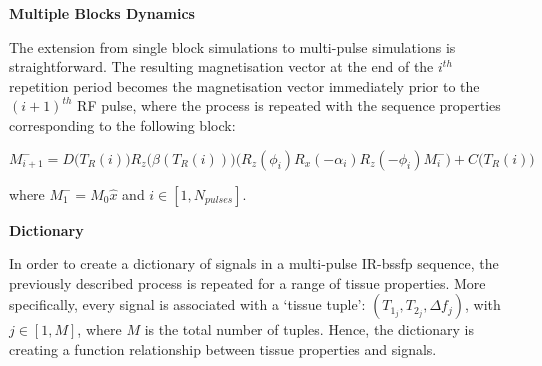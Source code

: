 \hfill

\large \textbf{Multiple Blocks Dynamics} \normalsize

The extension from single block simulations to multi-pulse simulations is straightforward.
The resulting magnetisation vector at the end of the $i^{th}$ repetition period becomes the magnetisation vector immediately prior to the $(i+1)^{th}$ RF pulse, where the process is repeated with the sequence properties corresponding to the following block:

\begin{equation}
    M^{-}_{i+1} = D\big(T_R(i)\big) R_z\big(\beta(T_R(i))\big) \big( R_{z}(\phi_i) R_{x}(-\alpha_i) R_{z}(-\phi_i) M^{-}_i \big) + C\big(T_R(i)\big)
\end{equation}

where $M^{-}_1 = M_0 \hat{x}$ and $i \in [1, N_{pulses}]$.

\hfill



\large \textbf{Dictionary} \normalsize

In order to create a dictionary of signals in a multi-pulse IR-\ac{bssfp} sequence, the previously described process is repeated for a range of tissue properties.
More specifically, every signal is associated with a `tissue tuple':
$(T_{1_j}, T_{2_j}, \Delta f_{j})$, with $j \in [1, M]$, where $M$ is the total number of tuples.
Hence, the dictionary is creating a function relationship between tissue properties and signals.

\hfill


